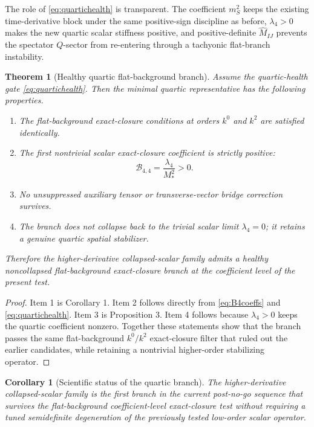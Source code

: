 \documentclass[11pt]{article}
\newtheorem{corollary}{Corollary}
\newtheorem{theorem}{Theorem}
\begin{document}
The role of \eqref{eq:quartichealth} is transparent. The coefficient \(m_S^2\) keeps the existing time-derivative block under the same positive-sign discipline as before, \(\lambda_4>0\) makes the new quartic scalar stiffness positive, and positive-definite \(\widehat M_{IJ}\) prevents the spectator \(Q\)-sector from re-entering through a tachyonic flat-branch instability.

\begin{theorem}[Healthy quartic flat-background branch]
Assume the quartic-health gate \eqref{eq:quartichealth}. Then the minimal quartic representative has the following properties.
\begin{enumerate}
    \item The flat-background exact-closure conditions at orders \(k^0\) and \(k^2\) are satisfied identically.
    \item The first nontrivial scalar exact-closure coefficient is strictly positive:
    \begin{equation}
    \mathcal B_{4,4}=\frac{\lambda_4}{M_*^2}>0.
    \label{eq:B44positive}
    \end{equation}
    \item No unsuppressed auxiliary tensor or transverse-vector bridge correction survives.
    \item The branch does not collapse back to the trivial scalar limit \(\lambda_4=0\); it retains a genuine quartic spatial stabilizer.
\end{enumerate}
Therefore the higher-derivative collapsed-scalar family admits a healthy noncollapsed flat-background exact-closure branch at the coefficient level of the present test.
\end{theorem}

\begin{proof}
Item 1 is Corollary 1. Item 2 follows directly from \eqref{eq:B4coeffs} and \eqref{eq:quartichealth}. Item 3 is Proposition 3. Item 4 follows because \(\lambda_4>0\) keeps the quartic coefficient nonzero. Together these statements show that the branch passes the same flat-background \(k^0/k^2\) exact-closure filter that ruled out the earlier candidates, while retaining a nontrivial higher-order stabilizing operator.
\end{proof}

\begin{corollary}[Scientific status of the quartic branch]
The higher-derivative collapsed-scalar family is the first branch in the current post-no-go sequence that survives the flat-background coefficient-level exact-closure test without requiring a tuned semidefinite degeneration of the previously tested low-order scalar operator.
\end{corollary}
\end{document}
